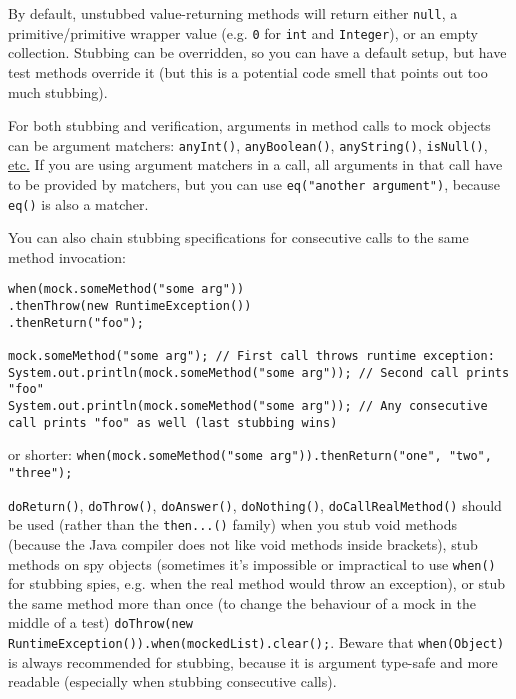 \documentclass[8pt, table, xcdraw]{article}%
\begin{document}
By default, unstubbed value-returning methods will return either \lstinline{null}, a primitive/primitive wrapper value (e.g. \lstinline{0} for \lstinline{int} and \lstinline{Integer}), or an empty collection. Stubbing can be overridden, so you can have a default setup, but have test methods override it (but this is a potential code smell that points out too much stubbing).

For both stubbing and verification, arguments in method calls to mock objects can be argument matchers: \lstinline{anyInt()}, \lstinline{anyBoolean()}, \lstinline{anyString()}, \lstinline{isNull()}, \href{https://javadoc.io/static/org.mockito/mockito-core/5.15.2/org/mockito/ArgumentMatchers.html#method-summary}{etc.} If you are using argument matchers in a call, all arguments in that call have to be provided by matchers, but you can use \lstinline{eq("another argument")}, because \lstinline{eq()} is also a matcher.

You can also chain stubbing specifications for consecutive calls to the same method invocation:

\begin{lstlisting}
when(mock.someMethod("some arg"))
.thenThrow(new RuntimeException())
.thenReturn("foo");

mock.someMethod("some arg"); // First call throws runtime exception:
System.out.println(mock.someMethod("some arg")); // Second call prints "foo"
System.out.println(mock.someMethod("some arg")); // Any consecutive call prints "foo" as well (last stubbing wins)
\end{lstlisting}

or shorter: \lstinline{when(mock.someMethod("some arg")).thenReturn("one", "two", "three");}

\lstinline{doReturn()}, \lstinline{doThrow()}, \lstinline{doAnswer()}, \lstinline{doNothing()}, \lstinline{doCallRealMethod()} should be used (rather than the \lstinline{then...()} family) when you stub void methods (because the Java compiler does not like void methods inside brackets), stub methods on spy objects (sometimes it's impossible or impractical to use \lstinline{when()} for stubbing spies, e.g. when the real method would throw an exception), or stub the same method more than once (to change the behaviour of a mock in the middle of a test) \lstinline{doThrow(new RuntimeException()).when(mockedList).clear();}. Beware that \lstinline{when(Object)} is always recommended for stubbing, because it is argument type-safe and more readable (especially when stubbing consecutive calls).
\end{document}
